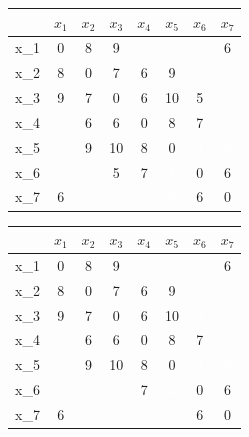 \documentclass[12pt]{article}
\begin{document}
\begin{center}
        \begin{tabular}{ |c|c|c|c|c|c|c|c| }
                \hline
				 & $x_1$ & $x_2$ & $x_3$ & $x_4$ & $x_5$ & $x_6$ & $x_7$\\
                \hline
				x_1 & 0 & 8 & 9 & \infty & \infty & \infty & 6 \\
                \hline
				x_2 & 8 & 0 & 7 & 6 & 9 & \infty & \infty \\
                \hline
				x_3 & 9 & 7 & 0 & 6 & 10 & \cellcolor{gray}5 & \infty \\
                \hline
				x_4 & \infty & 6 & 6 & 0 & 8 & 7 & \infty \\
                \hline
				x_5 & \infty & 9 & 10 & 8 & 0 & \cellcolor{black}\textcolor{white}4 & \cellcolor{black}\textcolor{white}5 \\
                \hline
				x_6 & \infty & \infty & \cellcolor{gray}5 & 7 & \cellcolor{black}\textcolor{white}4 & 0 & 6\\
                \hline
				x_7 & 6 & \infty & \infty & \infty & \cellcolor{black}\textcolor{white}5 & 6 & 0\\
                \hline
        \end{tabular}
\end{center}

\begin{center}
        \begin{tabular}{ |c|c|c|c|c|c|c|c| }
                \hline
				 & $x_1$ & $x_2$ & $x_3$ & $x_4$ & $x_5$ & $x_6$ & $x_7$\\
                \hline
				x_1 & 0 & 8 & 9 & \infty & \infty & \infty & \cellcolor{gray}6 \\
                \hline
				x_2 & 8 & 0 & 7 & 6 & 9 & \infty & \infty \\
                \hline
				x_3 & 9 & 7 & 0 & 6 & 10 & \cellcolor{black}\textcolor{white}5 & \infty \\
                \hline
				x_4 & \infty & 6 & 6 & 0 & 8 & 7 & \infty \\
                \hline
				x_5 & \infty & 9 & 10 & 8 & 0 & \cellcolor{black}\textcolor{white}4 & \cellcolor{black}\textcolor{white}5 \\
                \hline
				x_6 & \infty & \infty & \cellcolor{black}\textcolor{white}5 & 7 & \cellcolor{black}\textcolor{white}4 & 0 & 6\\
                \hline
				x_7 & \cellcolor{gray}6 & \infty & \infty & \infty & \cellcolor{black}\textcolor{white}5 & 6 & 0\\
                \hline
        \end{tabular}
\end{center}
\end{document}
